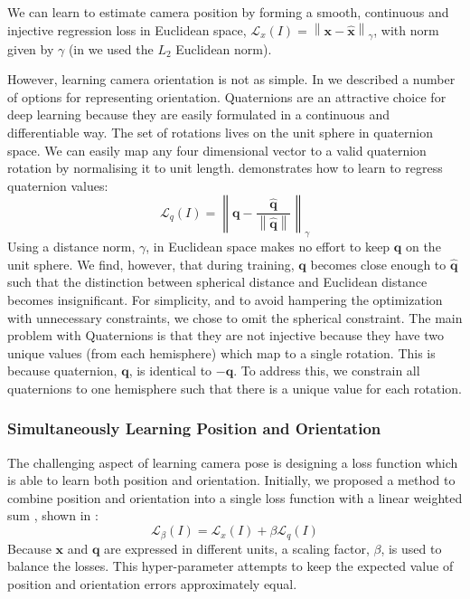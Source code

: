 We can learn to estimate camera position by forming a smooth, continuous and injective regression loss in Euclidean space, $\mathcal{L}_x(I) = \left\lVert\mathbf{x} - \mathbf{\hat{x}}\right\rVert_\gamma$, with norm given by $\gamma$ (in \citep{kendall2015posenet} we used the $L_2$ Euclidean norm).

However, learning camera orientation is not as simple. In  we described a number of options for representing orientation. Quaternions are an attractive choice for deep learning because they are easily formulated in a continuous and differentiable way. The set of rotations lives on the unit sphere in quaternion space. We can easily map any four dimensional vector to a valid quaternion rotation by normalising it to unit length. \citep{kendall2015posenet} demonstrates how to learn to regress quaternion values:
\begin{equation}
\mathcal{L}_q(I) = \left\lVert \mathbf{q}-\frac{\mathbf{\hat{q}}}{\left\lVert\mathbf{\hat{q}}\right\rVert}\right\rVert_\gamma
\label{eqn:loss_quaternion_posenet}
\end{equation}
Using a distance norm, $\gamma$, in Euclidean space makes no effort to keep $\mathbf{q}$ on the unit sphere. We find, however, that during training, $\mathbf{q}$ becomes close enough to $\mathbf{\hat{q}}$ such that the distinction between spherical distance and Euclidean distance becomes insignificant. For simplicity, and to avoid hampering the optimization with unnecessary constraints, we chose to omit the spherical constraint. The main problem with Quaternions is that they are not injective because they have two unique values (from each hemisphere) which map to a single rotation. This is because quaternion, $\textbf{q}$, is identical to $-\textbf{q}$. To address this, we constrain all quaternions to one hemisphere such that there is a unique value for each rotation.

\subsubsection{Simultaneously Learning Position and Orientation}
\label{sec:loss_weighted}

The challenging aspect of learning camera pose is designing a loss function which is able to learn both position and orientation. Initially, we proposed a method to combine position and orientation into a single loss function with a linear weighted sum \citep{kendall2015posenet}, shown in :
\begin{equation}
\mathcal{L}_{\beta}(I) = \mathcal{L}_x(I) + \beta \mathcal{L}_q(I)
\label{eqn:loss1}
\end{equation}
Because $\mathbf{x}$ and $\mathbf{q}$ are expressed in different units, a scaling factor, $\beta$, is used to balance the losses. This hyper-parameter attempts to keep the expected value of position and orientation errors approximately equal.


